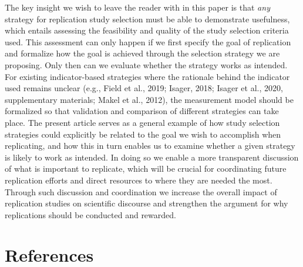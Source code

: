 \documentclass[
  english,
  jou,floatsintext]{apa6}
\begin{document}
The key insight we wish to leave the reader with in this paper is that \emph{any} strategy for replication study selection must be able to demonstrate usefulness, which entails assessing the feasibility and quality of the study selection criteria used. This assessment can only happen if we first specify the goal of replication and formalize how the goal is achieved through the selection strategy we are proposing. Only then can we evaluate whether the strategy works as intended. For existing indicator-based strategies where the rationale behind the indicator used remains unclear (e.g., Field et al., 2019; Isager, 2018; Isager et al., 2020, supplementary materials; Makel et al., 2012), the measurement model should be formalized so that validation and comparison of different strategies can take place. The present article serves as a general example of how study selection strategies could explicitly be related to the goal we wish to accomplish when replicating, and how this in turn enables us to examine whether a given strategy is likely to work as intended. In doing so we enable a more transparent discussion of what is important to replicate, which will be crucial for coordinating future replication efforts and direct resources to where they are needed the most. Through such discussion and coordination we increase the overall impact of replication studies on scientific discourse and strengthen the argument for why replications should be conducted and rewarded.

\hypertarget{references}{%
\section*{References}\label{references}}
\end{document}
